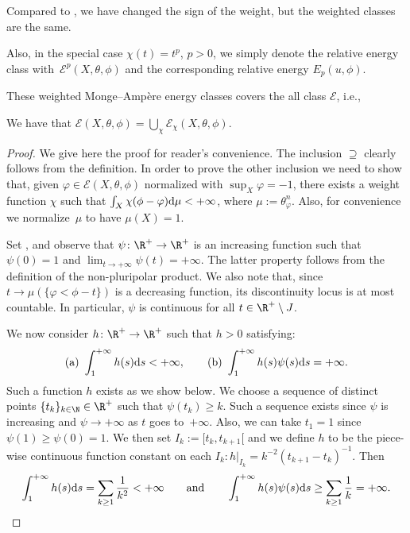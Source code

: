 Compared to \cite{GZ07}, we have changed the sign of the weight, but the weighted classes are the same.

Also, in the special case $\chi(t)=t^p$, $p>0$, we simply denote the relative energy class with~${\mathcal{E}^p(X,\theta,\phi)}$
and the corresponding relative energy $E_p(u,\phi)$.

These weighted Monge--Amp\`ere energy classes covers the all class $\mathcal{E}$, i.e.,

\begin{Lemma}\label{energy union} We have that
$\mathcal{E}(X,\theta,\phi)=\bigcup_{\chi}\mathcal{E}_\chi(X,\theta,\phi)$.
\end{Lemma}

\begin{proof}We give here the proof for reader's convenience.
The inclusion $ \supseteq $ clearly follows from the definition. In order to prove the other inclusion we need to show that, given $\varphi \in \mathcal{E}(X,\theta,\phi)$ normalized with $\sup_X \varphi =-1$, there exists a weight function $\chi$ such that $\int_X \chi (\phi-\varphi) {\rm d}\mu < +\infty$, where $\mu:=\theta_\varphi^n$. Also, for convenience we normalize~$\mu$ to have $\mu(X)=1$.

Set , and observe that $\psi\colon\R^+\rightarrow \R^+$ is an increasing function such that $\psi(0)=1$ and $\lim_{t\rightarrow +\infty} \psi(t) =+\infty$. The latter property follows from the definition of the non-pluripolar product. We also note that, since $t\rightarrow \mu(\{\varphi <\phi -t\})$ is a decreasing function, its discontinuity locus is at most countable. In particular, $\psi$ is continuous for all $t\in \R^+\setminus J$.

We now consider $h\colon \R^+\rightarrow \R^+$ such that $h> 0$ satisfying:
\[{\rm (a)} \ \int_1^{+\infty} h(s) {\rm d}s <+\infty, \qquad {\rm (b)} \ \int_1^{+\infty} {h(s)} \psi(s) {\rm d}s =+\infty.\]
 Such a function $h$ exists as we show below. We choose a sequence of distinct points $\{t_k\}_{k\in \N}\in \R^+$ such that $\psi(t_k) \geq k$. Such a sequence exists since $\psi$ is increasing and $\psi\rightarrow +\infty $ as $t$ goes to~$+\infty$. Also, we can take $t_1=1$ since $\psi(1)\geq \psi(0)=1$. We then set $I_k:=[t_{k}, t_{k+1}[$ and we define $h$ to be the piece-wise continuous function constant on each $I_k\colon h|_{I_k}= k^{-2} (t_{k+1}-t_k)^{-1} $. Then
 \[\int_1^{+\infty} h(s) {\rm d}s= \sum_{k\geq 1} \frac{1}{k^2} <+\infty \qquad \text{and}\qquad \int_1^{+\infty}h(s)\psi(s) {\rm d}s\geq \sum_{k\geq 1}\frac{1}{k} =+\infty.\]


\end{proof}
